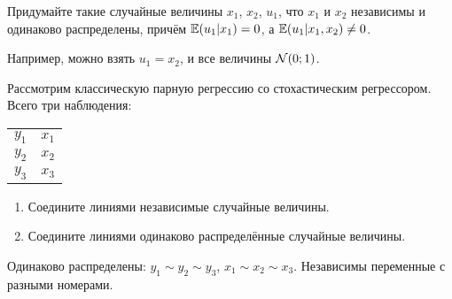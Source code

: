 \begin{problem}
  Придумайте такие случайные величины $x_1$, $x_2$, $u_1$, что $x_1$ и $x_2$ независимы и одинаково распределены, причём $\mathbb{E}(u_1|x_1)=0$, а $\mathbb{E}(u_1|x_1, x_2) \neq 0$.
\begin{sol}
  Например, можно взять $u_1=x_2$, и все величины $\mathcal{N}(0;1)$.
\end{sol}
\end{problem}

\begin{problem}
 Рассмотрим классическую парную регрессию со стохастическим регрессором. Всего три наблюдения:

 \begin{tabular}{rr}
 \toprule
 $y_1$ & $x_1$ \\
 $y_2$ & $x_2$ \\
 $y_3$ & $x_3$ \\
 \bottomrule
 \end{tabular}

\begin{enumerate}
 \item Соедините линиями независимые случайные величины.
 \item Соедините линиями одинаково распределённые случайные величины.
\end{enumerate}

\begin{sol}
  Одинаково распределены: $y_1 \sim y_2 \sim y_3$, $x_1 \sim x_2 \sim x_3$. Независимы переменные с разными номерами.
\end{sol}
\end{problem}


